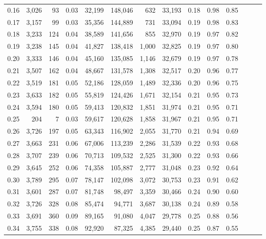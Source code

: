 \begin{tabular}{rrrrrrrrrrrrrr}
0.16 &  3,026 &   93 &  0.03 &   32,199 &  148,046 &     632 &  33,193 &  0.18 &  0.98 &      0.85 \\
0.17 &  3,157 &   99 &  0.03 &   35,356 &  144,889 &     731 &  33,094 &  0.19 &  0.98 &      0.83 \\
0.18 &  3,233 &  124 &  0.04 &   38,589 &  141,656 &     855 &  32,970 &  0.19 &  0.97 &      0.82 \\
0.19 &  3,238 &  145 &  0.04 &   41,827 &  138,418 &   1,000 &  32,825 &  0.19 &  0.97 &      0.80 \\
0.20 &  3,333 &  146 &  0.04 &   45,160 &  135,085 &   1,146 &  32,679 &  0.19 &  0.97 &      0.78 \\
0.21 &  3,507 &  162 &  0.04 &   48,667 &  131,578 &   1,308 &  32,517 &  0.20 &  0.96 &      0.77 \\
0.22 &  3,519 &  181 &  0.05 &   52,186 &  128,059 &   1,489 &  32,336 &  0.20 &  0.96 &      0.75 \\
0.23 &  3,633 &  182 &  0.05 &   55,819 &  124,426 &   1,671 &  32,154 &  0.21 &  0.95 &      0.73 \\
0.24 &  3,594 &  180 &  0.05 &   59,413 &  120,832 &   1,851 &  31,974 &  0.21 &  0.95 &      0.71 \\
0.25 &    204 &    7 &  0.03 &   59,617 &  120,628 &   1,858 &  31,967 &  0.21 &  0.95 &      0.71 \\
0.26 &  3,726 &  197 &  0.05 &   63,343 &  116,902 &   2,055 &  31,770 &  0.21 &  0.94 &      0.69 \\
0.27 &  3,663 &  231 &  0.06 &   67,006 &  113,239 &   2,286 &  31,539 &  0.22 &  0.93 &      0.68 \\
0.28 &  3,707 &  239 &  0.06 &   70,713 &  109,532 &   2,525 &  31,300 &  0.22 &  0.93 &      0.66 \\
0.29 &  3,645 &  252 &  0.06 &   74,358 &  105,887 &   2,777 &  31,048 &  0.23 &  0.92 &      0.64 \\
0.30 &  3,789 &  295 &  0.07 &   78,147 &  102,098 &   3,072 &  30,753 &  0.23 &  0.91 &      0.62 \\
0.31 &  3,601 &  287 &  0.07 &   81,748 &   98,497 &   3,359 &  30,466 &  0.24 &  0.90 &      0.60 \\
0.32 &  3,726 &  328 &  0.08 &   85,474 &   94,771 &   3,687 &  30,138 &  0.24 &  0.89 &      0.58 \\
0.33 &  3,691 &  360 &  0.09 &   89,165 &   91,080 &   4,047 &  29,778 &  0.25 &  0.88 &      0.56 \\
0.34 &  3,755 &  338 &  0.08 &   92,920 &   87,325 &   4,385 &  29,440 &  0.25 &  0.87 &      0.55 \\

\end{tabular}
